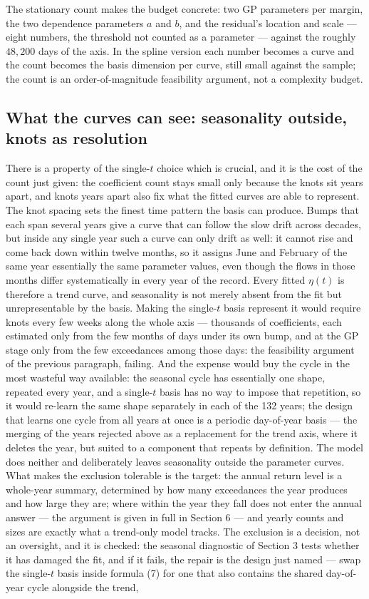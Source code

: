 \documentclass[11pt]{article}
\begin{document}
The stationary count makes the budget concrete: two GP parameters per margin, the two dependence parameters $a$ and $b$, and the residual's location and scale --- eight numbers, the threshold not counted as a parameter --- against the roughly $48{,}200$ days of the axis. In the spline version each number becomes a curve and the count becomes the basis dimension per curve, still small against the sample; the count is an order-of-magnitude feasibility argument, not a complexity budget.

\subsection{What the curves can see: seasonality outside, knots as resolution}\label{sec:seasonknots}

There is a property of the single-$t$ choice which is crucial, and it is the cost of the count just given: the coefficient count stays small only because the knots sit years apart, and knots years apart also fix what the fitted curves are able to represent. The knot spacing sets the finest time pattern the basis can produce. Bumps that each span several years give a curve that can follow the slow drift across decades, but inside any single year such a curve can only drift as well: it cannot rise and come back down within twelve months, so it assigns June and February of the same year essentially the same parameter values, even though the flows in those months differ systematically in every year of the record. Every fitted $\eta(t)$ is therefore a trend curve, and seasonality is not merely absent from the fit but unrepresentable by the basis. Making the single-$t$ basis represent it would require knots every few weeks along the whole axis — thousands of coefficients, each estimated only from the few months of days under its own bump, and at the GP stage only from the few exceedances among those days: the feasibility argument of the previous paragraph, failing. And the expense would buy the cycle in the most wasteful way available: the seasonal cycle has essentially one shape, repeated every year, and a single-$t$ basis has no way to impose that repetition, so it would re-learn the same shape separately in each of the 132 years; the design that learns one cycle from all years at once is a periodic day-of-year basis — the merging of the years rejected above as a replacement for the trend axis, where it deletes the year, but suited to a component that repeats by definition. The model does neither and deliberately leaves seasonality outside the parameter curves. What makes the exclusion tolerable is the target: the annual return level is a whole-year summary, determined by how many exceedances the year produces and how large they are; where within the year they fall does not enter the annual answer — the argument is given in full in Section 6 — and yearly counts and sizes are exactly what a trend-only model tracks. The exclusion is a decision, not an oversight, and it is checked: the seasonal diagnostic of Section 3 tests whether it has damaged the fit, and if it fails, the repair is the design just named — swap the single-$t$ basis inside formula (7) for one that also contains the shared day-of-year cycle alongside the trend, 
\end{document}
